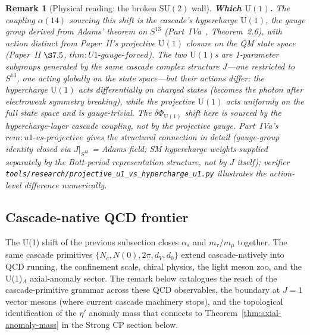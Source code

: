 \documentclass[12pt,a4paper]{article}
\newtheorem*{remark}{Remark}
\begin{document}
\begin{remark}[Physical reading: the broken $\mathrm{SU}(2)$ wall]
\medskip\noindent\textbf{Which $\mathrm{U}(1)$.} The coupling $\alpha(14)$
sourcing this shift is the cascade's \emph{hypercharge} $\mathrm{U}(1)$,
the gauge group derived from Adams' theorem on $S^{13}$
(Part~IVa~\cite{part4a}, Theorem~2.6), with action distinct from
Paper~II's \emph{projective} $\mathrm{U}(1)$ closure on the QM state
space (Paper~II $\S 7.5$,
$\mathit{thm{:}U1{\text{-}}gauge{\text{-}}forced}$). The two
$\mathrm{U}(1)$s are 1-parameter subgroups generated by the same
cascade complex structure $J$---one restricted to $S^{13}$, one
acting globally on the state space---but their actions differ: the
hypercharge $\mathrm{U}(1)$ acts \emph{differentially} on charged
states (becomes the photon after electroweak symmetry breaking),
while the projective $\mathrm{U}(1)$ acts \emph{uniformly} on the
full state space and is gauge-trivial. The
$\delta\Phi_{\mathrm{U}(1)}$ shift here is sourced by the
hypercharge-layer cascade coupling, not by the projective gauge.
Part~IVa's $\mathit{rem{:}u1{\text{-}}vs{\text{-}}projective}$ gives
the structural connection in detail (gauge-group identity closed via
$J|_{S^{13}}$ = Adams field; SM hypercharge weights supplied
separately by the Bott-period representation structure, not by $J$
itself); verifier
\texttt{tools/research/projective\_u1\_vs\_hypercharge\_u1.py}
illustrates the action-level difference numerically.
\end{remark}

\subsection{Cascade-native QCD frontier}\label{subsec:qcd-frontier}

\noindent The U(1) shift of the previous subsection closes $\alpha_s$ and $m_\tau/m_\mu$ together. The same cascade primitives $\{N_c, N(0), 2\pi, d_V, d_0\}$ extend cascade-natively into QCD running, the confinement scale, chiral physics, the light meson zoo, and the U(1)$_{\!A}$ axial-anomaly sector. The remark below catalogues the reach of the cascade-primitive grammar across these QCD observables, the boundary at $J=1$ vector mesons (where current cascade machinery stops), and the topological identification of the $\eta'$ anomaly mass that connects to Theorem~\ref{thm:axial-anomaly-mass} in the Strong CP section below.
\end{document}

